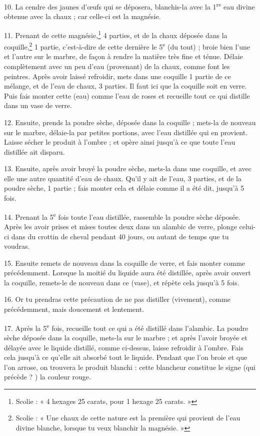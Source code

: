 \documentclass[a4paper, 11pt, oneside, polutonikogreek, french]{article}
\begin{document}
10. La cendre des jaunes d'œufs qui se déposera, blanchis-la avec la 1\textsuperscript{re} eau divine obtenue avec la chaux ; car celle-ci est la magnésie.

11. Prenant de cette magnésie,\footnote{Scolie : « 4 hexages 25 carats, pour 1 hexage 25 carats. »} 4 parties, et de la chaux déposée dans la coquille,\footnote{Scolie : « Une chaux de cette nature est la première qui provient de l'eau divine blanche, lorsque tu veux blanchir la magnésie. »} 1 partie, c'est-à-dire de cette dernière le 5\textsuperscript{e} (du tout) ; broie bien l'une et l'autre sur le marbre, de façon à rendre la matière très fine et ténue. Délaie complètement avec un peu d'eau (provenant) de la chaux, comme font les peintres. Après avoir laissé refroidir, mets dans une coquille 1 partie de ce mélange, et de l'eau de chaux, 3 parties. Il faut ici que la coquille soit en verre. Puis fais monter cette (eau) comme l'eau de roses et recueille tout ce qui distille dans un vase de verre.

12. Ensuite, prends la poudre sèche, déposée dans la coquille ; mets-la de nouveau sur le marbre, délaie-la par petites portions, avec l'eau distillée qui en provient. Laisse sécher le produit à l'ombre ; et opère ainsi jusqu'à ce que toute l'eau distillée ait disparu.

13. Ensuite, après avoir broyé la poudre sèche, mets-la dans une coquille, et avec elle une autre quantité d'eau de chaux. Qu'il y ait de l'eau, 3 parties, et de la poudre sèche, 1 partie ; fais monter cela et délaie comme il a été dit, jusqu'à 5 fois.

14. Prenant la 5\textsuperscript{e} fois toute l'eau distillée, rassemble la poudre sèche déposée. Après les avoir prises et mises toutes deux dans un alambic de verre, plonge celui-ci dans du crottin de cheval pendant 40 jours, ou autant de temps que tu voudras.

15. Ensuite remets de nouveau dans la coquille de verre, et fais monter comme précédemment. Lorsque la moitié du liquide aura été distillée, après avoir ouvert la coquille, remets-le de nouveau dans ce (vase), et répète cela jusqu'à 5 fois.

16. Or tu prendras cette précaution de ne pas distiller (vivement), comme précédemment, mais doucement et lentement.

17. Après la 5\textsuperscript{e} fois, recueille tout ce qui a été distillé dans l'alambic. La poudre sèche déposée dans la coquille, mets-la sur le marbre ; et après l'avoir broyée et délayée avec le liquide distillé, comme ci-dessus, laisse refroidir à l'ombre. Fais cela jusqu'à ce qu'elle ait absorbé tout le liquide. Pendant que l'on broie et que l'on arrose, on trouvera le produit blanchi : cette blancheur constitue le signe (qui précède ? ) la couleur rouge.
\end{document}
